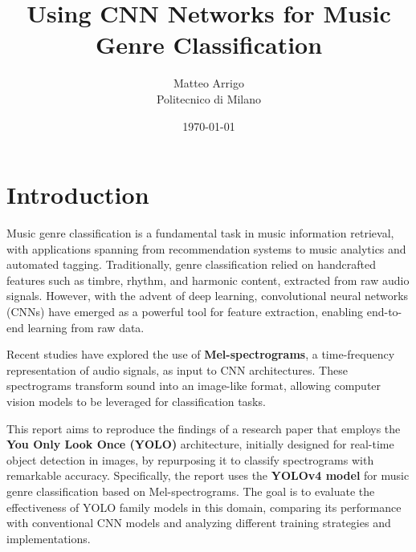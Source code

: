\documentclass[a4paper,12pt]{article}
\title{\LARGE \textbf{Using CNN Networks for Music Genre Classification}}
\author{Matteo Arrigo \\ Politecnico di Milano}
\date{\today}
\begin{document}
\maketitle


\tableofcontents
\newpage

\section{Introduction}

Music genre classification is a fundamental task in music information retrieval, with applications spanning from recommendation systems to music analytics and automated tagging. Traditionally, genre classification relied on handcrafted features such as timbre, rhythm, and harmonic content, extracted from raw audio signals. However, with the advent of deep learning, convolutional neural networks (CNNs) have emerged as a powerful tool for feature extraction, enabling end-to-end learning from raw data.

Recent studies have explored the use of \textbf{Mel-spectrograms}, a time-frequency representation of audio signals, as input to CNN architectures. These spectrograms transform sound into an image-like format, allowing computer vision models to be leveraged for classification tasks.

This report aims to reproduce the findings of a research paper \cite{ref_paper} that employs the \textbf{You Only Look Once (YOLO)} architecture, initially designed for real-time object detection in images, by repurposing it to classify spectrograms with remarkable accuracy. Specifically, the report uses the \textbf{YOLOv4 model} for music genre classification based on Mel-spectrograms. The goal is to evaluate the effectiveness of YOLO family models in this domain, comparing its performance with conventional CNN models and analyzing different training strategies and implementations.
\end{document}
